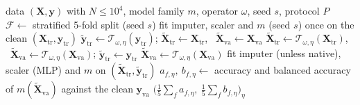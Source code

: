 \documentclass[pdflatex,sn-mathphys]{sn-jnl}
\theoremstyle{thmstyleone}
\theoremstyle{thmstyletwo}
\theoremstyle{thmstylethree}
\begin{document}
\begin{algorithm}[t]
\caption{Evaluation of one trajectory $(\mathcal{D},m,\omega,s)$ under Protocol~A or~B}\label{alg:cell}
\begin{algorithmic}[1]
\Require data $(\mathbf{X},\mathbf{y})$ with $N\le10^{4}$, model family $m$, operator $\omega$, seed $s$, protocol $P$
\State $\mathcal{F}\gets$ stratified 5-fold split (seed $s$)
   \State fit imputer, scaler and $m$ (seed $s$) once on the clean $(\mathbf{X}_{\mathrm{tr}},\mathbf{y}_{\mathrm{tr}})$ \EndIf
      \State $\tilde{\mathbf{y}}_{\mathrm{tr}}\gets\mathcal{T}_{\omega,\eta}(\mathbf{y}_{\mathrm{tr}})$; \quad $\tilde{\mathbf{X}}_{\mathrm{tr}}\gets\mathbf{X}_{\mathrm{tr}}$, \ $\tilde{\mathbf{X}}_{\mathrm{va}}\gets\mathbf{X}_{\mathrm{va}}$
      \State $\tilde{\mathbf{X}}_{\mathrm{tr}}\gets\mathcal{T}_{\omega,\eta}(\mathbf{X}_{\mathrm{tr}})$, \ $\tilde{\mathbf{X}}_{\mathrm{va}}\gets\mathcal{T}_{\omega,\eta}(\mathbf{X}_{\mathrm{va}})$; \quad $\tilde{\mathbf{y}}_{\mathrm{tr}}\gets\mathbf{y}_{\mathrm{tr}}$
    \Else
      \State $\tilde{\mathbf{X}}_{\mathrm{va}}\gets\mathcal{T}_{\omega,\eta}(\mathbf{X}_{\mathrm{va}})$ 
    \EndIf
     \State fit imputer (unless native), scaler (MLP) and $m$ on $(\tilde{\mathbf{X}}_{\mathrm{tr}},\tilde{\mathbf{y}}_{\mathrm{tr}})$ \EndIf
    \State $a_{f,\eta},\ b_{f,\eta}\gets$ accuracy and balanced accuracy of $m(\tilde{\mathbf{X}}_{\mathrm{va}})$ against the clean $\mathbf{y}_{\mathrm{va}}$
  \EndFor
\EndFor
\State \Return $\bigl(\tfrac15\sum_f a_{f,\eta},\ \tfrac15\sum_f b_{f,\eta}\bigr)_{\eta}$
\end{algorithmic}
\end{algorithm}
\end{document}
